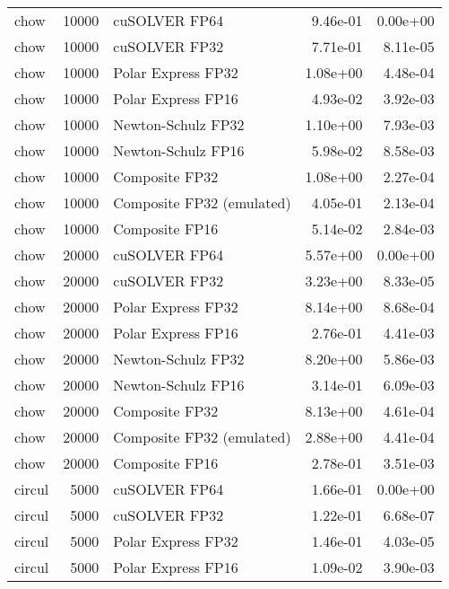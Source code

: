 \begin{table}
\begin{tabular}{lrlrr}
     chow & 10000 &             cuSOLVER FP64 &  9.46e-01 &        0.00e+00 \\
     chow & 10000 &             cuSOLVER FP32 &  7.71e-01 &        8.11e-05 \\
     chow & 10000 &        Polar Express FP32 &  1.08e+00 &        4.48e-04 \\
     chow & 10000 &        Polar Express FP16 &  4.93e-02 &        3.92e-03 \\
     chow & 10000 &        Newton-Schulz FP32 &  1.10e+00 &        7.93e-03 \\
     chow & 10000 &        Newton-Schulz FP16 &  5.98e-02 &        8.58e-03 \\
     chow & 10000 &            Composite FP32 &  1.08e+00 &        2.27e-04 \\
     chow & 10000 & Composite FP32 (emulated) &  4.05e-01 &        2.13e-04 \\
     chow & 10000 &            Composite FP16 &  5.14e-02 &        2.84e-03 \\
     chow & 20000 &             cuSOLVER FP64 &  5.57e+00 &        0.00e+00 \\
     chow & 20000 &             cuSOLVER FP32 &  3.23e+00 &        8.33e-05 \\
     chow & 20000 &        Polar Express FP32 &  8.14e+00 &        8.68e-04 \\
     chow & 20000 &        Polar Express FP16 &  2.76e-01 &        4.41e-03 \\
     chow & 20000 &        Newton-Schulz FP32 &  8.20e+00 &        5.86e-03 \\
     chow & 20000 &        Newton-Schulz FP16 &  3.14e-01 &        6.09e-03 \\
     chow & 20000 &            Composite FP32 &  8.13e+00 &        4.61e-04 \\
     chow & 20000 & Composite FP32 (emulated) &  2.88e+00 &        4.41e-04 \\
     chow & 20000 &            Composite FP16 &  2.78e-01 &        3.51e-03 \\
   circul &  5000 &             cuSOLVER FP64 &  1.66e-01 &        0.00e+00 \\
   circul &  5000 &             cuSOLVER FP32 &  1.22e-01 &        6.68e-07 \\
   circul &  5000 &        Polar Express FP32 &  1.46e-01 &        4.03e-05 \\
   circul &  5000 &        Polar Express FP16 &  1.09e-02 &        3.90e-03 \\

\end{tabular}
\end{table}
